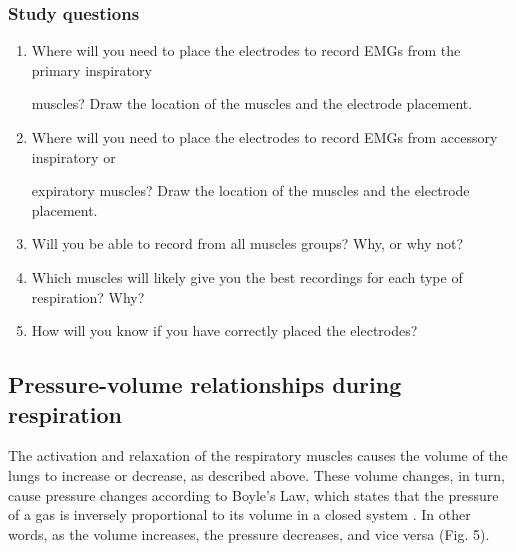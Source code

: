 \documentclass{article}
\begin{document}
\subsubsection{Study questions}

\begin{enumerate}
\item Where will you need to place the electrodes to record EMGs from the primary inspiratory

muscles? Draw the location of the muscles and the electrode placement.


\item Where will you need to place the electrodes to record EMGs from accessory inspiratory or

expiratory muscles? Draw the location of the muscles and the electrode placement.


\item Will you be able to record from all muscles groups? Why, or why not?


\item Which muscles will likely give you the best recordings for each type of respiration? Why?


\item How will you know if you have correctly placed the electrodes?
\end{enumerate}

\subsection{Pressure-volume relationships during respiration}

The activation and relaxation of the respiratory muscles causes the volume of the lungs to increase or decrease, as described above. These volume changes, in turn, cause pressure changes according to Boyle's Law, which states that the pressure of a gas is inversely proportional to its volume in a closed system \citep{openStax_breathing}. In other words, as the volume increases, the pressure decreases, and vice versa (Fig. 5).
\end{document}
